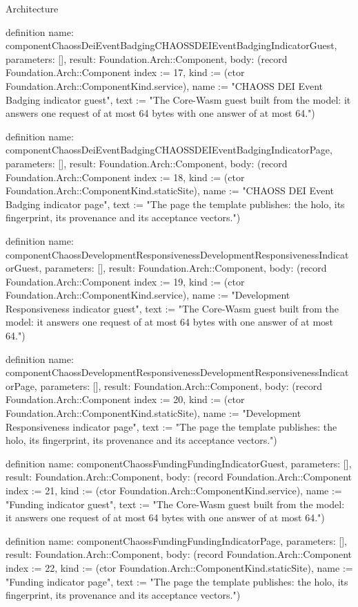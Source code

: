 \begin{lexlean}{Architecture}
\begin{semanticmodule}
definition{
  name: componentChaossDeiEventBadgingCHAOSSDEIEventBadgingIndicatorGuest,
  parameters: [],
  result: Foundation.Arch::Component,
  body: (record Foundation.Arch::Component {index := 17, kind := (ctor Foundation.Arch::ComponentKind.service), name := "CHAOSS DEI Event Badging indicator guest", text := "The Core-Wasm guest built from the model: it answers one request of at most 64 bytes with one answer of at most 64."})
}

definition{
  name: componentChaossDeiEventBadgingCHAOSSDEIEventBadgingIndicatorPage,
  parameters: [],
  result: Foundation.Arch::Component,
  body: (record Foundation.Arch::Component {index := 18, kind := (ctor Foundation.Arch::ComponentKind.staticSite), name := "CHAOSS DEI Event Badging indicator page", text := "The page the template publishes: the holo, its fingerprint, its provenance and its acceptance vectors."})
}

definition{
  name: componentChaossDevelopmentResponsivenessDevelopmentResponsivenessIndicatorGuest,
  parameters: [],
  result: Foundation.Arch::Component,
  body: (record Foundation.Arch::Component {index := 19, kind := (ctor Foundation.Arch::ComponentKind.service), name := "Development Responsiveness indicator guest", text := "The Core-Wasm guest built from the model: it answers one request of at most 64 bytes with one answer of at most 64."})
}

definition{
  name: componentChaossDevelopmentResponsivenessDevelopmentResponsivenessIndicatorPage,
  parameters: [],
  result: Foundation.Arch::Component,
  body: (record Foundation.Arch::Component {index := 20, kind := (ctor Foundation.Arch::ComponentKind.staticSite), name := "Development Responsiveness indicator page", text := "The page the template publishes: the holo, its fingerprint, its provenance and its acceptance vectors."})
}

definition{
  name: componentChaossFundingFundingIndicatorGuest,
  parameters: [],
  result: Foundation.Arch::Component,
  body: (record Foundation.Arch::Component {index := 21, kind := (ctor Foundation.Arch::ComponentKind.service), name := "Funding indicator guest", text := "The Core-Wasm guest built from the model: it answers one request of at most 64 bytes with one answer of at most 64."})
}

definition{
  name: componentChaossFundingFundingIndicatorPage,
  parameters: [],
  result: Foundation.Arch::Component,
  body: (record Foundation.Arch::Component {index := 22, kind := (ctor Foundation.Arch::ComponentKind.staticSite), name := "Funding indicator page", text := "The page the template publishes: the holo, its fingerprint, its provenance and its acceptance vectors."})
}


\end{semanticmodule}
\end{lexlean}
